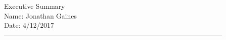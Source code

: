 \documentclass[12pt, tikz]{article}
\begin{document}
Executive Summary\\ 
Name: Jonathan Gaines\\ 
Date: 4/12/2017\\ -----------------------------------------------------------------------------------------------
\end{document}
